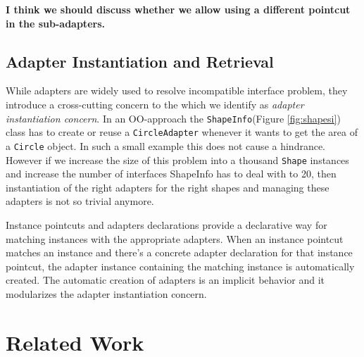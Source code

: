 \documentclass{llncs}
\begin{document}
\textbf{\textcolor[rgb]{1,0,0}{I think we should discuss whether we allow using a different pointcut in the sub-adapters.}}

\subsection{Adapter Instantiation and Retrieval}
While adapters are widely used to resolve incompatible interface problem, they introduce a cross-cutting concern to the which we identify as \emph{adapter instantiation concern}. In an OO-approach  the \texttt{ShapeInfo}(Figure \ref{fig:shapesi}) class has to create or reuse a \texttt{CircleAdapter} whenever it wants to get the area of a \texttt{Circle} object. In such a small example this does not cause a hindrance. However if we increase the size of this problem into a thousand \texttt{Shape} instances and increase the number of interfaces ShapeInfo has to deal with to 20, then instantiation of the right adapters for the right shapes and managing these adapters is not so trivial anymore. 

Instance pointcuts and adapters declarations provide a declarative way for matching instances with the appropriate adapters. When an instance pointcut matches an instance and there's a concrete adapter declaration for that instance pointcut, the adapter instance containing the matching instance is automatically created. The automatic creation of adapters is an implicit behavior and it modularizes the adapter instantiation concern. 


\section{Related Work}
\end{document}
